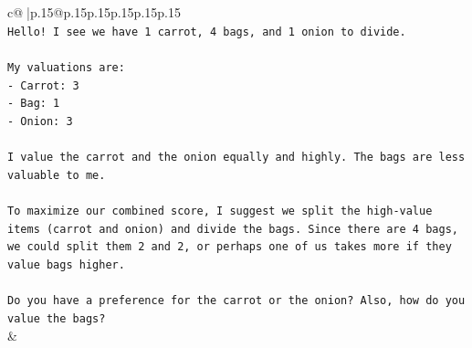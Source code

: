 \documentclass{article}
\begin{document}
{\begin{supertabular}{c@{$\;$}|p{.15\linewidth}@{}p{.15\linewidth}p{.15\linewidth}p{.15\linewidth}p{.15\linewidth}p{.15\linewidth}}
{{{\\ 
\texttt{Hello! I see we have 1 carrot, 4 bags, and 1 onion to divide.} \\
\\ 
\texttt{My valuations are:} \\
\texttt{{-} Carrot: 3} \\
\texttt{{-} Bag: 1} \\
\texttt{{-} Onion: 3} \\
\\ 
\texttt{I value the carrot and the onion equally and highly. The bags are less valuable to me.} \\
\\ 
\texttt{To maximize our combined score, I suggest we split the high{-}value items (carrot and onion) and divide the bags. Since there are 4 bags, we could split them 2 and 2, or perhaps one of us takes more if they value bags higher.} \\
\\ 
\texttt{Do you have a preference for the carrot or the onion? Also, how do you value the bags?} \\
            }
        }
    }
    & \\ \\


\end{supertabular}}
\end{document}
